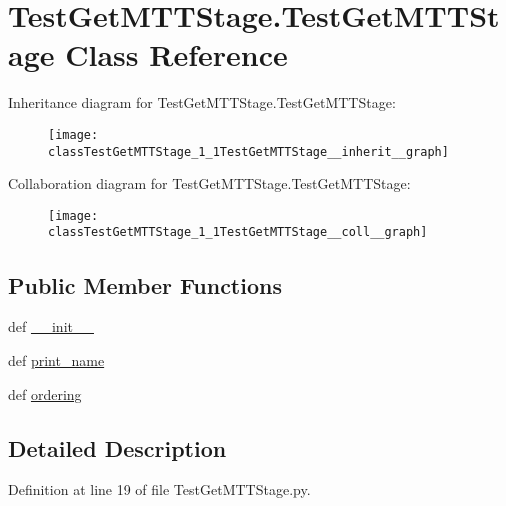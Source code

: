 \hypertarget{classTestGetMTTStage_1_1TestGetMTTStage}{\section{Test\-Get\-M\-T\-T\-Stage.\-Test\-Get\-M\-T\-T\-Stage Class Reference}
\label{classTestGetMTTStage_1_1TestGetMTTStage}
}


Inheritance diagram for Test\-Get\-M\-T\-T\-Stage.\-Test\-Get\-M\-T\-T\-Stage\-:\nopagebreak
\begin{figure}[H]
\begin{center}
\leavevmode
\texttt{[image: classTestGetMTTStage\_1\_1TestGetMTTStage\_\_inherit\_\_graph]}
\end{center}
\end{figure}


Collaboration diagram for Test\-Get\-M\-T\-T\-Stage.\-Test\-Get\-M\-T\-T\-Stage\-:\nopagebreak
\begin{figure}[H]
\begin{center}
\leavevmode
\texttt{[image: classTestGetMTTStage\_1\_1TestGetMTTStage\_\_coll\_\_graph]}
\end{center}
\end{figure}
\subsection*{Public Member Functions}
\begin{DoxyCompactItemize}
\item 
def \hyperlink{classTestGetMTTStage_1_1TestGetMTTStage_adcada621115f6b12cdc9b0949da5e969}{\-\_\-\-\_\-init\-\_\-\-\_\-}
\item 
def \hyperlink{classTestGetMTTStage_1_1TestGetMTTStage_a6082004f762323aea42aab7c638066de}{print\-\_\-name}
\item 
def \hyperlink{classTestGetMTTStage_1_1TestGetMTTStage_a41143acbbabbc2b3990ed1cff8101907}{ordering}
\end{DoxyCompactItemize}


\subsection{Detailed Description}


Definition at line 19 of file Test\-Get\-M\-T\-T\-Stage.\-py.



